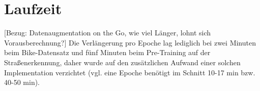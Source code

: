 \section{Laufzeit}

[Bezug: Datenaugmentation on the Go, wie viel Länger, lohnt sich Vorausberechnung?]
Die Verlängerung pro Epoche lag lediglich bei zwei Minuten beim Bike-Datensatz und fünf Minuten beim Pre-Training auf der 
Straßenerkennung, daher wurde auf den zusätzlichen Aufwand einer solchen Implementation verzichtet 
(vgl. eine Epoche benötigt im Schnitt 10-17 min bzw. 40-50 min). 




		


